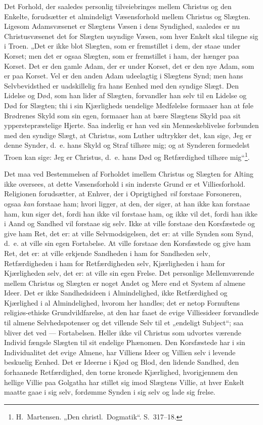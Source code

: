 \documentclass[12pt]{book}
\begin{document}
Det Forhold, der saaledes personlig tilveiebringes mellem Christus
og den Enkelte, forudsætter et almindeligt Væsensforhold mellem
Christus og Slægten. Ligesom Adamsvæsenet er Slægtens Væsen i dens
Syndighed, saaledes er nu Christusvæsenet det for Slægten usyndige
Væsen, som hver Enkelt skal tilegne sig i Troen. „Det er ikke blot
Slægten, som er fremstillet i dem, der staae under Korset; men det
er ogsaa Slægten, som er fremstillet i ham, der hænger paa Korset.
Det er den gamle Adam, der er under Korset, det er den nye Adam, som
er paa Korset. Vel er den anden Adam udeelagtig i Slægtens Synd; men
hans Selvbevidsthed er uadskillelig fra hans Eenhed med den syndige
Slægt. Den Lidelse og Død, som han lider af Slægten, forvandler han
selv til en Lidelse og Død for Slægten; thi i sin Kjærligheds
uendelige Medfølelse formaaer han at føle Brødrenes Skyld som sin
egen, formaaer han at bære Slægtens Skyld paa sit ypperstepræstelige
Hjerte. Saa inderlig er han ved sin Menneskeblivelse forbunden med
den syndige Slægt, at Christus, som Luther udtrykker det, kan sige,
Jeg er denne Synder, d.\ e. hans Skyld og Straf tilhøre mig; og at
Synderen formedelst Troen kan sige: Jeg er Christus, d.\ e. hans Død
og Retfærdighed tilhøre mig“\footnote{H.\ Martensen. „Den christl.\
Dogmatik“. S.\ 317--18.}.

Det maa ved Bestemmelsen af Forholdet imellem Christus og Slægten
for Alting ikke oversees, at dette Væsensforhold i sin inderste
Grund er et Villiesforhold. Religionen forudsætter, at Enhver, der i
Oprigtighed \emph{vil} forstaae Forsoneren, ogsaa \emph{kan} forstaae
ham; hvori ligger, at den, der siger, at han ikke kan forstaae ham,
kun siger det, fordi han ikke vil forstaae ham, og ikke vil det,
fordi han ikke i Aand og Sandhed vil forstaae sig selv. Ikke at
ville forstaae den Korsfæstede og give ham Ret, det er: at ville
Selvmodsigelsen, det er: at ville Synden som Synd, d.\ e. at ville
sin egen Fortabelse. At ville forstaae den Korsfæstede og give ham
Ret, det er: at ville erkjende Sandheden i ham for Sandheden selv,
Retfærdigheden i ham for Retfærdigheden selv, Kjærligheden i ham for
Kjærligheden selv, det er: at ville sin egen Frelse. Det personlige
Mellemværende mellem Christus og Slægten er noget Andet og Mere end
et System af almene Ideer. Det er ikke Sandhedsideen i
Almindelighed, ikke Retfærdighed og Kjærlighed i al Almindelighed,
hvorom her handles; det er netop Fornuftens religiøs-ethiske
Grundvildfarelse, at den har faaet de evige Villiesideer forvandlede
til almene Selvhedspotenser og det villende Selv til et „endeligt
Subject“; saa bliver det ved --- Fortabelsen. Heller ikke vil
Christus som udvortes værende Individ fængsle Slægten til sit
endelige Phænomen. Den Korsfæstede har i sin Individualitet det
evige Almene, har Villiens Ideer og Villien selv i levende beskuelig
Eenhed. Det er Ideerne i Kjød og Blod, den lidende Sandhed, den
forhaanede Retfærdighed, den torne\-
kronede Kjærlighed, hvorigjennem den hellige Villie paa Golgatha har
stillet sig imod Slægtens Villie, at hver Enkelt maatte gaae i sig
selv, fordømme Synden i sig selv og lade sig frelse.
\end{document}
